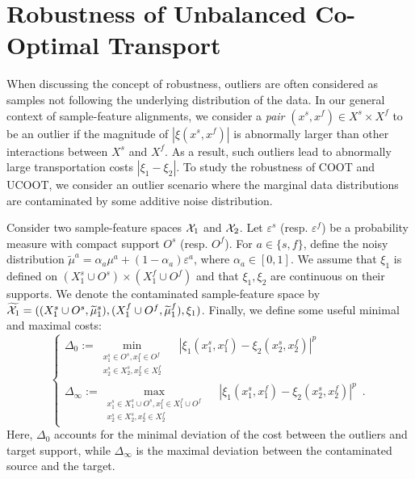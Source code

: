 \section{Robustness of Unbalanced Co-Optimal Transport} \label{sec:robustness}
When discussing the concept of robustness, outliers are often considered as samples
not following the underlying distribution of the data. In our general context of
sample-feature alignments, we consider a \emph{pair} $(x^s, x^f) \in X^s \times X^f$
to be an outlier if the magnitude of $|\xi(x^s, x^f)|$ is abnormally larger than
other interactions between $X^s$ and $X^f$. As a result, such outliers lead to
abnormally large transportation costs $|\xi_1 - \xi_2|$. To study the robustness of COOT and UCOOT,
we consider an outlier scenario where the marginal data distributions are contaminated
by some additive noise distribution.
\begin{assumption}
\label{assump:robust}
Consider two sample-feature spaces $\mathcal X_1$ and $\mathcal X_2$.
Let $\varepsilon^s$ (resp. $\varepsilon^f$) be a probability measure with
compact support $O^s$ (resp. $O^f$). For $a \in \{s, f\}$,
define the noisy distribution $\widetilde{\mu}^a = \alpha_a \mu^a + (1-\alpha_a) \varepsilon^a$,
where $\alpha_a \in [0,1]$. We assume that $\xi_1$ is defined on
$(X^s_1 \cup O^s) \times (X^f_1 \cup O^f)$ and
that $\xi_1, \xi_2$ are continuous on their supports.
We denote the contaminated sample-feature space by
$\widetilde{\mathcal X_1} = ((X^s_1 \cup O^s, \widetilde{\mu}^s_1), (X^f_1 \cup O^f, \widetilde{\mu}^f_1), \xi_1)$.
Finally, we define some useful minimal and maximal costs:
  \begin{equation}
    \begin{cases}
  \Delta_{0} := \min\limits_{
  \substack{
       x_1^s \in O^s, x_1^f \in O^f  \\
       x_2^s \in X_2^s, x_2^f \in X_2^f
  }}\quad |\xi_1(x_1^s, x_1^f) - \xi_2(x_2^s, x_2^f)|^p \\
  \Delta_{\infty} := \max\limits_{
  \substack{
  x_1^s \in X_1^s \cup O^s, x_1^f \in X_1^f \cup O^f \\
  x_2^s \in X_2^s, x_2^f \in X_2^f
  }} \quad|\xi_1(x_1^s, x_1^f) - \xi_2(x_2^s, x_2^f)|^p \enspace.
  \end{cases}
  \end{equation}
Here, $\Delta_{0}$ accounts for the minimal deviation of the cost between
the outliers and target support, while $\Delta_{\infty}$ is the maximal deviation
between the contaminated source and the target.
\end{assumption}
